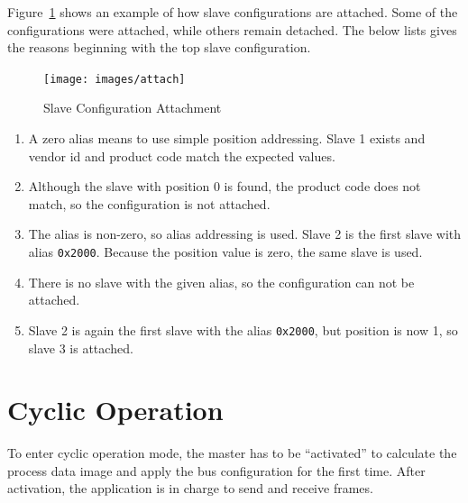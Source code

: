 \documentclass[a4paper,12pt,BCOR6mm,bibtotoc,idxtotoc]{scrbook}
\begin{document}
Figure~\ref{fig:attach} shows an example of how slave configurations are
attached. Some of the configurations were attached, while others remain
detached. The below lists gives the reasons beginning with the top slave
configuration.

\begin{figure}[htbp]
  \centering
  \texttt{[image: images/attach]}
  \caption{Slave Configuration Attachment}
  \label{fig:attach}
\end{figure}

\begin{enumerate}

\item A zero alias means to use simple position addressing. Slave 1 exists and
vendor id and product code match the expected values.

\item Although the slave with position 0 is found, the product code does not
match, so the configuration is not attached.

\item The alias is non-zero, so alias addressing is used. Slave 2 is the first
slave with alias \lstinline+0x2000+. Because the position value is zero, the
same slave is used.

\item There is no slave with the given alias, so the configuration can not be
attached.

\item Slave 2 is again the first slave with the alias \lstinline+0x2000+, but
position is now 1, so slave 3 is attached.

\end{enumerate}


\section{Cyclic Operation}
\label{sec:cyclic}


To enter cyclic operation mode, the master has to be ``activated'' to
calculate the process data image and apply the bus configuration for the first
time. After activation, the application is in charge to send and receive
frames.

%

\end{document}
